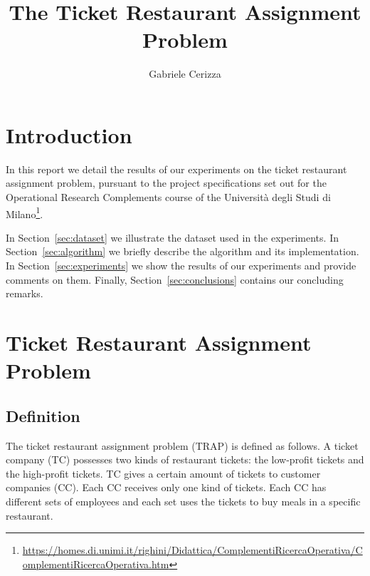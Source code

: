 \documentclass[runningheads]{llncs}
\begin{document}
\title{
  The Ticket Restaurant Assignment Problem
}
\author{Gabriele Cerizza}


\maketitle

\section*{Introduction}
\label{sec:introduction}

In this report we detail the results of our experiments on the ticket restaurant assignment problem, pursuant to the project specifications set out for the Operational Research Complements course of the Università degli Studi di Milano\footnote{\url{https://homes.di.unimi.it/righini/Didattica/ComplementiRicercaOperativa/ComplementiRicercaOperativa.htm}}. 

In Section~\ref{sec:dataset} we illustrate the dataset used in the experiments. In Section~\ref{sec:algorithm} we briefly describe the algorithm and its implementation. In Section~\ref{sec:experiments} we show the results of our experiments and provide comments on them. Finally, Section~\ref{sec:conclusions} contains our concluding remarks. 

\section{Ticket Restaurant Assignment Problem}
\label{sec:problem}

\subsection{Definition}
\label{subsec:problem:definition}

The ticket restaurant assignment problem (TRAP) is defined as follows.
A ticket company (TC) possesses two kinds of restaurant tickets: the low-profit tickets and the high-profit tickets. TC gives a certain amount of tickets to customer companies (CC). Each CC receives only one kind of tickets. Each CC has different sets of employees and each set uses the tickets to buy meals in a specific restaurant.  
\end{document}
